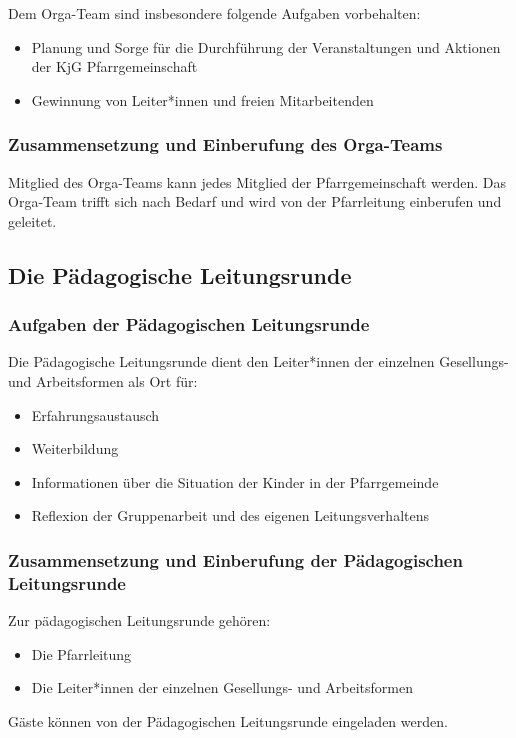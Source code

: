 \documentclass[12pt]{report}
\begin{document}
\begin{flushleft}
Dem Orga-Team sind insbesondere folgende Aufgaben vorbehalten:
\begin{itemize}
  \item Planung und Sorge für die Durchführung der Veranstaltungen und Aktionen der KjG Pfarrgemeinschaft
  \item Gewinnung von Leiter*innen und freien Mitarbeitenden
\end{itemize}

\subsubsection{Zusammensetzung und Einberufung des Orga-Teams}
Mitglied des Orga-Teams kann jedes Mitglied der Pfarrgemeinschaft werden. Das Orga-Team
trifft sich nach Bedarf und wird von der Pfarrleitung einberufen und geleitet.

\subsection{Die Pädagogische Leitungsrunde}

\subsubsection{Aufgaben der Pädagogischen Leitungsrunde}
Die Pädagogische Leitungsrunde dient den Leiter*innen der einzelnen Gesellungs- und Arbeitsformen als Ort für:
\begin{itemize}
  \item Erfahrungsaustausch
  \item Weiterbildung
  \item Informationen über die Situation der {\color{red} Kinder} in der Pfarrgemeinde
  \item Reflexion der Gruppenarbeit und des eigenen Leitungsverhaltens
\end{itemize}

\subsubsection{Zusammensetzung und Einberufung der Pädagogischen Leitungsrunde}
Zur pädagogischen Leitungsrunde gehören:
\begin{itemize}
  \item Die Pfarrleitung
  \item Die Leiter*innen der einzelnen Gesellungs- und Arbeitsformen
\end{itemize}

Gäste können von der Pädagogischen Leitungsrunde eingeladen werden.


\end{flushleft}
\end{document}
